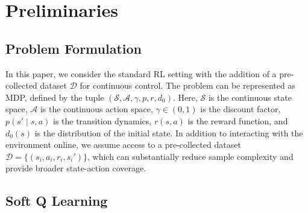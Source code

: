 \section{Preliminaries}
\subsection{Problem Formulation}

In this paper, we consider the standard RL setting with the addition of a pre-collected dataset \(\mathcal{D}\) for continuous control. 
The problem can be represented as MDP, defined by the tuple \((\mathcal{S}, \mathcal{A}, \gamma, p, r, d_0)\). 
Here, \(\mathcal{S}\) is the continuous state space, \(\mathcal{A}\) is the continuous action space, \(\gamma \in (0,1)\) is the discount factor, \(p(s' \mid s,a)\) is the transition dynamics, \(r(s,a)\) is the reward function, and \(d_0(s)\) is the distribution of the initial state.
In addition to interacting with the environment online, we assume access to a pre-collected dataset \(\mathcal{D}=\{(s_i,a_i,r_i,s_i')\}\), which can substantially reduce sample complexity and provide broader state-action coverage.

\subsection{Soft Q Learning}

